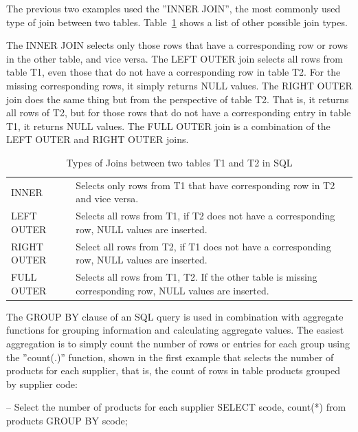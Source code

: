 \begin{advanced}
The previous two examples used the ''INNER JOIN'', the most commonly used type of join between two tables. Table~\ref{tab:sqljoins} shows a list of other possible join types. 

The INNER JOIN selects only those rows that have a corresponding row or rows in the other table, and vice versa. The LEFT OUTER join selects all rows from table T1, even those that do not have a corresponding row in table T2. For the missing corresponding rows, it simply returns NULL values. The RIGHT OUTER join does the same thing but from the perspective of table T2. That is, it returns all rows of T2, but for those rows that do not have a corresponding entry in table T1, it returns NULL values. The FULL OUTER join is a combination of the LEFT OUTER and RIGHT OUTER joins.

\begin{table}
\centering

\renewcommand{\arraystretch}{1.5}
\small
\begin{tabularx}{.8\textwidth}{l|X} \hline
INNER & Selects only rows from T1 that have corresponding row in T2 and vice versa. \\
LEFT OUTER & Selects all rows from T1, if T2 does not have a corresponding row, NULL values are inserted. \\
RIGHT OUTER & Select all rows from T2, if T1 does not have a corresponding row, NULL values are inserted. \\
FULL OUTER & Selects all rows from T1, T2. If the other table is missing corresponding row, NULL values are inserted. \\ \hline
\end{tabularx}

\caption{Types of Joins between two tables T1 and T2 in SQL}
\label{tab:sqljoins}
\end{table}
\end{advanced}

The GROUP BY clause of an SQL query is used in combination with aggregate functions for grouping information and calculating aggregate values. The easiest aggregation is to simply count the number of rows or entries for each group using the ''count(.)'' function, shown in the first example that selects the number of products for each supplier, that is, the count of rows in table products grouped by supplier code:

\begin{sqlcode}
-- Select the number of products for each supplier
SELECT scode, count(*) from products GROUP BY scode;
\end{sqlcode}

